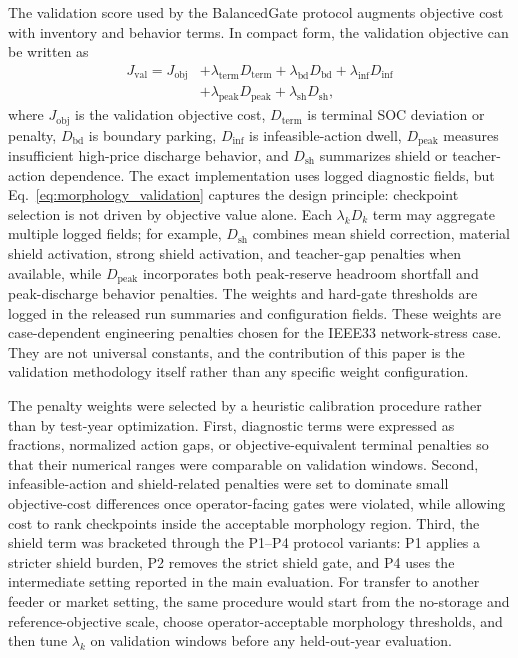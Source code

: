 The validation score used by the BalancedGate protocol augments objective cost with inventory and behavior terms. In compact form, the validation objective can be written as
\begin{equation}
\begin{aligned}
J_{\mathrm{val}} = J_{\mathrm{obj}} &+ \lambda_{\mathrm{term}}D_{\mathrm{term}} + \lambda_{\mathrm{bd}}D_{\mathrm{bd}} + \lambda_{\mathrm{inf}}D_{\mathrm{inf}} \\
&+ \lambda_{\mathrm{peak}}D_{\mathrm{peak}} + \lambda_{\mathrm{sh}}D_{\mathrm{sh}},
\end{aligned}
\label{eq:morphology_validation}
\end{equation}
where $J_{\mathrm{obj}}$ is the validation objective cost, $D_{\mathrm{term}}$ is terminal SOC deviation or penalty, $D_{\mathrm{bd}}$ is boundary parking, $D_{\mathrm{inf}}$ is infeasible-action dwell, $D_{\mathrm{peak}}$ measures insufficient high-price discharge behavior, and $D_{\mathrm{sh}}$ summarizes shield or teacher-action dependence. The exact implementation uses logged diagnostic fields, but Eq.~\eqref{eq:morphology_validation} captures the design principle: checkpoint selection is not driven by objective value alone. Each $\lambda_k D_k$ term may aggregate multiple logged fields; for example, $D_{\mathrm{sh}}$ combines mean shield correction, material shield activation, strong shield activation, and teacher-gap penalties when available, while $D_{\mathrm{peak}}$ incorporates both peak-reserve headroom shortfall and peak-discharge behavior penalties. The weights and hard-gate thresholds are logged in the released run summaries and configuration fields. These weights are case-dependent engineering penalties chosen for the IEEE33 network-stress case. They are not universal constants, and the contribution of this paper is the validation methodology itself rather than any specific weight configuration.

The penalty weights were selected by a heuristic calibration procedure rather than by test-year optimization. First, diagnostic terms were expressed as fractions, normalized action gaps, or objective-equivalent terminal penalties so that their numerical ranges were comparable on validation windows. Second, infeasible-action and shield-related penalties were set to dominate small objective-cost differences once operator-facing gates were violated, while allowing cost to rank checkpoints inside the acceptable morphology region. Third, the shield term was bracketed through the P1--P4 protocol variants: P1 applies a stricter shield burden, P2 removes the strict shield gate, and P4 uses the intermediate setting reported in the main evaluation. For transfer to another feeder or market setting, the same procedure would start from the no-storage and reference-objective scale, choose operator-acceptable morphology thresholds, and then tune $\lambda_k$ on validation windows before any held-out-year evaluation.

